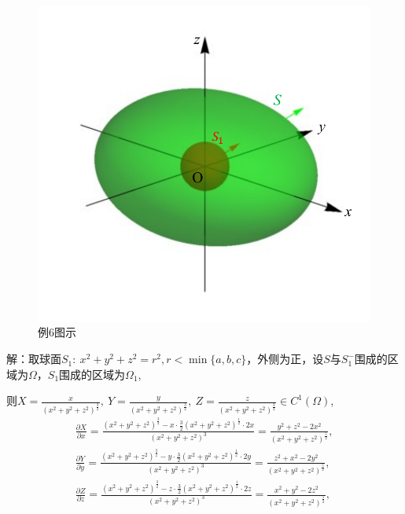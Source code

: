 \documentclass[12pt,UTF8,fleqn]{ctexart}
\newcommand{\pp}[2]{\frac{\partial #1}{\partial #2}}
\begin{document}
\begin{enumerate}
\begin{figure}[H]
\begin{center}
\includegraphics[height=0.5\textheight]{Figures24/Fig13-5-1-7.pdf}
\end{center}
\caption{例6图示}
\label{13-5-1-7}
\end{figure}

解：取球面$S_1:\ x^2+y^2+z^2=r^2,r<\min\{a,b,c\}$，外侧为正，设$S$与$S_1^-$围成的区域为$\Omega$，$S_1$围成的区域为$\Omega_1$,

则$X=\frac x{(x^2+y^2+z^2)^{\frac32}},\ Y=\frac y{(x^2+y^2+z^2)^{\frac32}},\ Z=\frac z{(x^2+y^2+z^2)^{\frac32}}\in C^1(\Omega)$,
\[\begin{aligned}
\pp Xx=\frac{(x^2+y^2+z^2)^{\frac32}-x\cdot\frac32(x^2+y^2+z^2)^{\frac12}\cdot2x}{(x^2+y^2+z^2)^3}=\frac{y^2+z^2-2x^2}{(x^2+y^2+z^2)^{\frac52}},\\
\pp Yy=\frac{(x^2+y^2+z^2)^{\frac32}-y\cdot\frac32(x^2+y^2+z^2)^{\frac12}\cdot2y}{(x^2+y^2+z^2)^3}=\frac{z^2+x^2-2y^2}{(x^2+y^2+z^2)^{\frac52}},\\
\pp Zz=\frac{(x^2+y^2+z^2)^{\frac32}-z\cdot\frac32(x^2+y^2+z^2)^{\frac12}\cdot2z}{(x^2+y^2+z^2)^3}=\frac{x^2+y^2-2z^2}{(x^2+y^2+z^2)^{\frac52}},
\end{aligned}\]


\end{enumerate}
\end{document}
